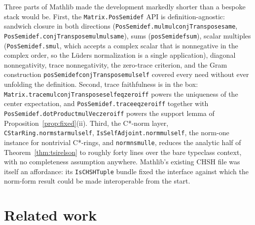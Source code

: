 \documentclass[11pt]{article}
\renewcommand{\_}{\textunderscore\allowbreak}
\theoremstyle{remark}
\begin{document}
Three parts of Mathlib made the development markedly shorter than a bespoke stack would be. First, the \texttt{Matrix.PosSemidef} API is definition-agnostic: sandwich closure in both directions (\texttt{PosSemidef.mul\_mul\_conjTranspose\_same}, \texttt{PosSemidef.conjTranspose\_mul\_mul\_same}), sums (\texttt{posSemidef\_sum}), scalar multiples (\texttt{PosSemidef.smul}, which accepts a complex scalar that is nonnegative in the complex order, so the L\"uders normalization is a single application), diagonal nonnegativity, trace nonnegativity, the zero-trace criterion, and the Gram construction \texttt{posSemidef\_conjTranspose\_mul\_self} covered every need without ever unfolding the definition. Second, trace faithfulness is in the box: \texttt{Matrix.trace\_mul\_conjTranspose\_self\_eq\_zero\_iff} powers the uniqueness of the center expectation, and \texttt{PosSemidef.trace\_eq\_zero\_iff} together with \texttt{PosSemidef.dotProduct\_mulVec\_zero\_iff} powers the support lemma of Proposition~\ref{prop:fixed}(ii). Third, the C*-norm layer, \texttt{CStarRing.norm\_star\_mul\_self}, \texttt{IsSelfAdjoint.norm\_mul\_self}, the norm-one instance for nontrivial C*-rings, and \texttt{norm\_nsmul\_le}, reduces the analytic half of Theorem~\ref{thm:tsirelson} to roughly forty lines over the bare typeclass context, with no completeness assumption anywhere. Mathlib's existing CHSH file was itself an affordance: its \texttt{IsCHSHTuple} bundle fixed the interface against which the norm-form result could be made interoperable from the start.

\section{Related work}
\label{sec:related}
\end{document}
